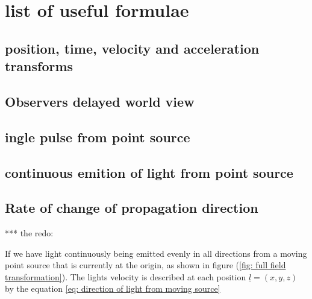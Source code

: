 \chapter{list of useful formulae}\label{ch: list of useful formulae}

\section{position, time, velocity and acceleration transforms}\label{sect: position, time and velocity transforms}

\section{Observers delayed world view}\label{sect: Observers delayed world view}

\section{ingle pulse from point source}\label{sect: ingle pulse from point source}

\section{continuous emition of light from point source}\label{sect: continuous emition of light from point source}

\section{Rate of change of propagation direction}\label{sect: Rate of change of propagation direction}

*** the redo:

If we have light continuously being emitted evenly in all directions from a moving point source that is currently at the origin, as shown in figure (\ref{fig: full field transformation}).
The lights velocity is described at each position $\underline{l}=(x,y,z)$ by the equation \eqref{eq: direction of light from moving source}

